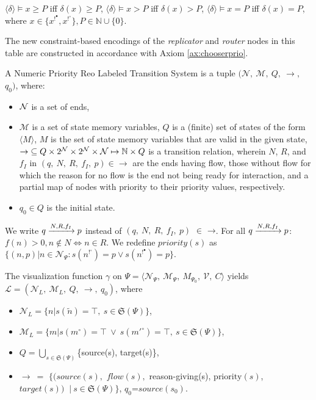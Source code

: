 $\langle\delta\rangle\vDash x \ge P $ iff $\delta(x)\ge P$, $\langle\delta\rangle\vDash x>P $ iff $\delta(x)> P$, $\langle\delta\rangle\vDash x=P $ iff $\delta(x)=P$, where $x\in\{x^{!^\bullet}, x^{!^\circ}\}, P\in \mathbb{N}\cup\{0\}$.

The new constraint-based encodings of the \emph{replicator} and \emph{router} nodes in this table are constructed in accordance with Axiom \ref{ax:chooserprio}. 

%

\begin{definition}[NPRLTS]
\label{def:rlts2N}
A Numeric Priority Reo Labeled Transition System is a tuple  %
$($$\mathcal{N},\ \mathcal{M},\ Q,$$\ \rightarrow,\ $$q_0)$, where:
\begin{itemize}
\item $\mathcal{N}$ is a set of ends, 
\item $\mathcal{M}$ is a set of state memory variables, $Q$ is a (finite) set of states of the form $\langle M %
\rangle$, $M$ is the set of state memory variables that are valid in the given state,  $\mathord{\rightarrow} \subseteq Q\times 2^{\mathcal{N}}\times 2^{\mathcal{N}} \times \mathcal{N} \mapsto \mathbb{N} \times Q$ is a transition relation, wherein $N$, $R$, and $f_I$ in $(q,\ N,\ R,\ f_I,\ p) \in \rightarrow$ 
are the ends having flow, those without flow for which the reason for no flow is the end not being ready for interaction, and a partial map of nodes with priority to their priority values, respectively.
\item $q_0 \in Q$ is the initial state. 
\end{itemize}

We write $q\xrightarrow{N,R,f_I}p$ instead of $(q,\  N,\ R,\ f_I,\ p)$ $\in$ $\mathord{\rightarrow}$. For all $q\xrightarrow{N,R,f_I}p$:
$f(n) > 0, n \notin N \Leftrightarrow n \in R$. We redefine $priority(s)$ as $\{(n, p)|n\in\mathcal{N}_{\Psi}: s(n^{!^\circ})=p \vee s(n^{!^\bullet})=p\}$.
\end{definition}

\begin{definition}
The visualization function $\gamma$ on $\Psi=\langle \mathcal{N}_{\Psi},\ \mathcal{M}_{\Psi},\ M_{\Psi_{0}},\ \mathcal{V},\ C\rangle$ 
yields $\mathcal{L}=(\mathcal{N}_L,\ \mathcal{M}_L,\ Q, \ \rightarrow,\ q_0)$, where 
\begin{itemize}
\item 
$\mathcal{N}_L=\{n|s(\tilde{n})=\top, \ s\in \mathfrak{S}(\Psi)\}$,
\item
$\mathcal{M}_L=\{m|s(m^\circ)=\top\ \vee \ s(m'^\circ)=\top, \ s\in \mathfrak{S}(\Psi)\}$,
\item
$Q=\bigcup_{s\in \mathfrak{S}(\Psi)}$\{source(s), target(s)\}, 
\item
$\rightarrow\ =$ $\{(source(s),$ $flow(s), $ reason-giving(s), $\text{priority}(s)$, $target(s))\ $ $|\ s\in \mathfrak{S}(\Psi)\}$, $q_0$=$source(s_0)$.
\end{itemize}
\end{definition}



